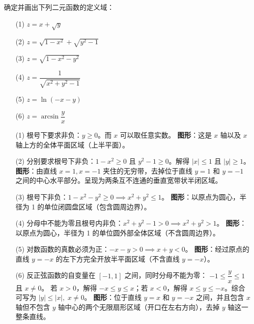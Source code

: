 \documentclass[lang=cn,11pt]{elegantbook}
\begin{document}
\begin{exercise}[求定义域]
确定并画出下列二元函数的定义域：
\begin{enumerate}
  \item[(1)] $z = x + \sqrt{y}$
  \item[(2)] $z = \sqrt{1-x^2} + \sqrt{y^2-1}$
  \item[(3)] $z = \sqrt{1-x^2-y^2}$
  \item[(4)] $z = \dfrac{1}{\sqrt{x^2+y^2-1}}$
  \item[(5)] $z = \ln(-x-y)$
  \item[(6)] $z = \arcsin\dfrac{y}{x}$
\end{enumerate}
\end{exercise}
\begin{solution}
\begin{enumerate}
  \item[(1)] 根号下要求非负：$y \geq 0$。而 $x$ 可以取任意实数。
  \textbf{图形}：这是 $x$ 轴以及 $x$ 轴上方的全体平面区域（上半平面）。
  \item[(2)] 分别要求根号下非负：$1-x^2 \geq 0$ 且 $y^2-1 \geq 0$。解得 $|x| \leqslant  1$ 且 $|y| \geq 1$。
  \textbf{图形}：由直线 $x=1, x=-1$ 夹住的无穷带，去掉位于直线 $y=1$ 和 $y=-1$ 之间的中心水平部分。呈现为两条互不连通的垂直宽带状半闭区域。
  \item[(3)] 根号下非负：$1-x^2-y^2 \geq 0 \implies x^2+y^2 \leqslant  1$。
  \textbf{图形}：以原点为圆心，半径为 1 的单位闭圆盘区域（包含圆周边界）。
  \item[(4)] 分母中不能为零且根号内非负：$x^2+y^2-1 > 0 \implies x^2+y^2 > 1$。
  \textbf{图形}：以原点为圆心，半径为 1 的单位圆外部全体区域（不含圆周边界）。
  \item[(5)] 对数函数的真数必须为正：$-x-y > 0 \implies x+y < 0$。
  \textbf{图形}：经过原点的直线 $y = -x$ 的左下方完全开放半平面区域（不含直线 $y=-x$）。
  \item[(6)] 反正弦函数的自变量在 $[-1, 1]$ 之间，同时分母不能为零：
  $-1 \leqslant  \dfrac{y}{x} \leqslant  1$ 且 $x \neq 0$。
  若 $x>0$，解得 $-x \leqslant  y \leqslant  x$；若 $x<0$，解得 $x \leqslant  y \leqslant  -x$。综合可写为 $|y| \leqslant  |x|,\; x \neq 0$。
  \textbf{图形}：位于直线 $y=x$ 和 $y=-x$ 之间，并且包含 $x$ 轴但不包含 $y$ 轴中心的两个无限扇形区域（开口在左右方向），去掉 $y$ 轴这一整条直线。
\end{enumerate}
\end{solution}
\end{document}
